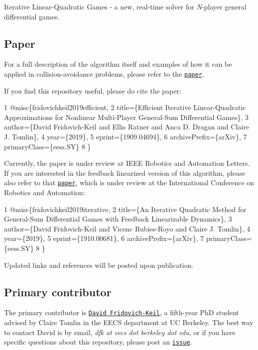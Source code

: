  

Iterative Linear-\/\+Quadratic Games -\/ a new, real-\/time solver for {\itshape N}-\/player general differential games.

\subsection*{Paper}

For a full description of the algorithm itself and examples of how it can be applied in collision-\/avoidance problems, please refer to the \href{https://arxiv.org/abs/1909.04694}{\tt paper}.

If you find this repository useful, please do cite the paper\+: 
\begin{DoxyCode}
1 @misc\{fridovichkeil2019efficient,
2     title=\{Efficient Iterative Linear-Quadratic Approximations for Nonlinear Multi-Player General-Sum
       Differential Games\},
3     author=\{David Fridovich-Keil and Ellis Ratner and Anca D. Dragan and Claire J. Tomlin\},
4     year=\{2019\},
5     eprint=\{1909.04694\},
6     archivePrefix=\{arXiv\},
7     primaryClass=\{eess.SY\}
8 \}
\end{DoxyCode}
 Currently, the paper is under review at I\+E\+EE Robotics and Automation Letters. If you are interested in the feedback linearized version of this algorithm, please also refer to that \href{https://arxiv.org/abs/1910.00681}{\tt paper}, which is under review at the International Conference on Robotics and Automation\+: 
\begin{DoxyCode}
1 @misc\{fridovichkeil2019iterative,
2     title=\{An Iterative Quadratic Method for General-Sum Differential Games with Feedback Linearizable
       Dynamics\},
3     author=\{David Fridovich-Keil and Vicenc Rubies-Royo and Claire J. Tomlin\},
4     year=\{2019\},
5     eprint=\{1910.00681\},
6     archivePrefix=\{arXiv\},
7     primaryClass=\{eess.SY\}
8 \}
\end{DoxyCode}
 Updated links and references will be posted upon publication.

\subsection*{Primary contributor}

The primary contributor is \href{https://people.eecs.berkeley.edu/~dfk/}{\tt David Fridovich-\/\+Keil}, a fifth-\/year PhD student advised by Claire Tomlin in the E\+E\+CS department at UC Berkeley. The best way to contact David is by email, {\itshape dfk at eecs dot berkeley dot edu}, or if you have specific questions about this repository, please post an \href{https://github.com/HJReachability/ilqgames/issues}{\tt issue}.

